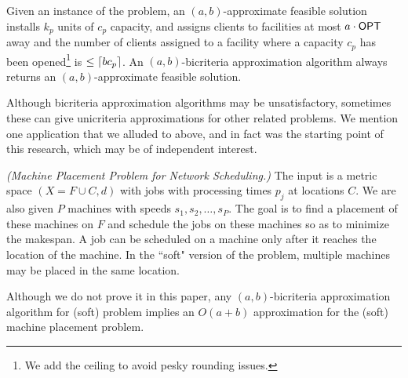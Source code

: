 \begin{definition}
	Given an instance of the \mckc problem, an $(a,b)$-approximate feasible solution installs $k_p$ units of $c_p$ capacity, and
	assigns clients to  facilities at most $a\cdot\mathsf{OPT}$ away and the number of clients assigned to a facility where a capacity
	$c_p$ has been opened\footnote{We add the ceiling to avoid pesky rounding issues.} is $\leq \lceil bc_p\rceil$. An $(a,b)$-bicriteria approximation algorithm always returns an $(a,b)$-approximate feasible solution.
\end{definition}
Although bicriteria approximation algorithms may be unsatisfactory, sometimes these can give unicriteria approximations for other related problems.
We mention one application that  we alluded to above, and in fact was the starting point of this research,  which may be of independent interest.
\begin{definition}\emph{(Machine Placement Problem for Network Scheduling.)}\label{fdef:mpp}
	The input is a metric space $(X=F\cup C,d)$ with jobs with processing times $p_j$ at locations $C$. We are also given $P$ machines with speeds $s_1,s_2,\ldots,s_P$.
	The goal is to find a placement of these machines on $F$ and schedule the jobs on these machines so as to minimize the makespan. A job can be scheduled on a machine only after it reaches the location of the machine. In the ``soft" version of the problem, multiple machines may be placed in the same location.
\end{definition}
Although we do not prove it in this paper, any $(a,b)$-bicriteria approximation algorithm for (soft) \mckc problem implies an $O(a+b)$ approximation for the (soft) machine placement problem.

